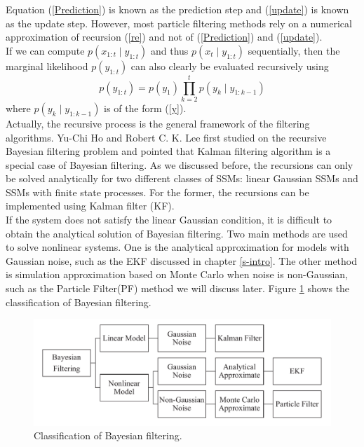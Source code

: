 \documentclass[mstat,12pt]{unswthesis}  %
\numberwithin{equation}{section}
\begin{document}
\noindent Equation (\ref{Prediction}) is known as the prediction step and (\ref{update}) is known as the update step. However, most
particle filtering methods rely on a numerical approximation of recursion (\ref{re}) and not of (\ref{Prediction}) and (\ref{update}).\\

\noindent If we can compute ${p\left(x_{1:t} \mid y_{1:t}\right)}$
and thus ${p\left(x_{t} \mid y_{1:t}\right)}$ sequentially, then the  marginal likelihood $p\left(y_{1:t}\right)$
can also clearly be evaluated recursively using
\begin{equation}\label{likelihood}
p\left(y_{1: t}\right)=p\left(y_{1}\right) \prod_{k=2}^{t} p\left(y_{k} \mid y_{1: k-1}\right)
\end{equation}
where $p\left(y_{k} \mid y_{1: k-1}\right)$ is of the form (\ref{y}).\\



\noindent Actually, the recursive process
is the general framework of the filtering algorithms.
Yu-Chi Ho and Robert C. K. Lee first studied on the 
recursive Bayesian filtering problem and
pointed that Kalman filtering algorithm is 
a special case of Bayesian filtering\cite{ho1964bayesian}.
As we discussed before, the recursions can only be solved analytically
for two different classes of SSMs: 
linear Gaussian SSMs and SSMs with finite state
processes.  
For the former, the recursions can be
implemented using Kalman filter (KF).\\

\noindent If the system does not satisfy the linear Gaussian condition,
it is difficult to obtain the analytical solution of Bayesian filtering. Two main methods are used to solve  nonlinear systems.
One is the analytical approximation for models with Gaussian noise, such as the EKF discussed in
chapter \ref{s-intro}.
The other method 
is simulation approximation based on Monte Carlo when noise is non-Gaussian, such as the Particle Filter(PF) method we will discuss later. 
Figure \ref{fig:bf} shows the classification of Bayesian filtering.\\

\begin{figure}[H]
    \centering
    \includegraphics[width=0.90\linewidth]{bf.pdf}
    \caption{Classification of Bayesian filtering.}
    \label{fig:bf}
\end{figure}
\end{document}
